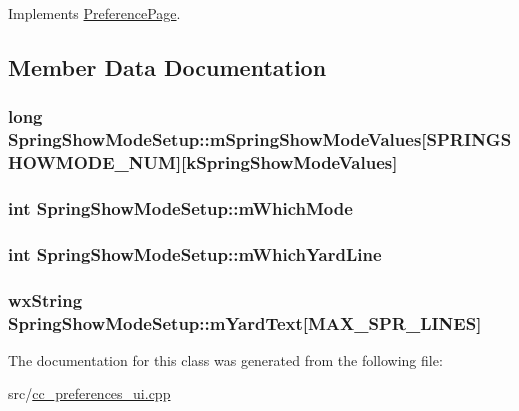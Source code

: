 Implements \hyperlink{a00116_ac21d8c929b71724f8198a2c45233d59c}{Preference\-Page}.



\subsection{Member Data Documentation}
\hypertarget{a00144_ac48fab376e165248b769655a820c6a8a}{
\subsubsection[{m\-Spring\-Show\-Mode\-Values}]{\setlength{\rightskip}{0pt plus 5cm}long Spring\-Show\-Mode\-Setup\-::m\-Spring\-Show\-Mode\-Values\mbox{[}{\bf S\-P\-R\-I\-N\-G\-S\-H\-O\-W\-M\-O\-D\-E\-\_\-\-N\-U\-M}\mbox{]}\mbox{[}{\bf k\-Spring\-Show\-Mode\-Values}\mbox{]}\hspace{0.3cm}{\ttfamily [private]}}}\label{a00144_ac48fab376e165248b769655a820c6a8a}
\hypertarget{a00144_a79ea08e9358fd9dbc26a79e277398c9e}{
\subsubsection[{m\-Which\-Mode}]{\setlength{\rightskip}{0pt plus 5cm}int Spring\-Show\-Mode\-Setup\-::m\-Which\-Mode\hspace{0.3cm}{\ttfamily [private]}}}\label{a00144_a79ea08e9358fd9dbc26a79e277398c9e}
\hypertarget{a00144_a47782334f5e8704b2246fe281a0c0866}{
\subsubsection[{m\-Which\-Yard\-Line}]{\setlength{\rightskip}{0pt plus 5cm}int Spring\-Show\-Mode\-Setup\-::m\-Which\-Yard\-Line\hspace{0.3cm}{\ttfamily [private]}}}\label{a00144_a47782334f5e8704b2246fe281a0c0866}
\hypertarget{a00144_a43310058719c2623dd4e19367ef83f98}{
\subsubsection[{m\-Yard\-Text}]{\setlength{\rightskip}{0pt plus 5cm}wx\-String Spring\-Show\-Mode\-Setup\-::m\-Yard\-Text\mbox{[}{\bf M\-A\-X\-\_\-\-S\-P\-R\-\_\-\-L\-I\-N\-E\-S}\mbox{]}\hspace{0.3cm}{\ttfamily [private]}}}\label{a00144_a43310058719c2623dd4e19367ef83f98}


The documentation for this class was generated from the following file\-:\begin{DoxyCompactItemize}
\item 
src/\hyperlink{a00187}{cc\-\_\-preferences\-\_\-ui.\-cpp}\end{DoxyCompactItemize}

